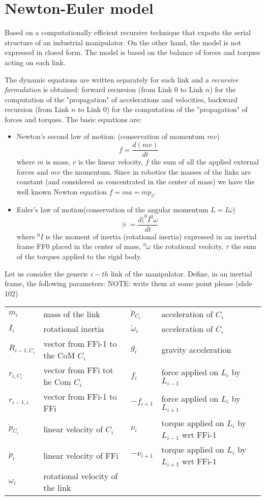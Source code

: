 \documentclass{book}
\begin{document}
\section{Newton-Euler model}
Based on a computationally efficient recursive technique that expoits the serial structure of an industrial manipulator. On the other hand, the model is not expressed in closed form.
The model is based on the balance of forces and torques acting on each link. 

The dynamic equations are written separately for each link and a \emph{recursive formulation} is obtained: forward recursion (from Link 0 to Link $n$) for the computation of the "propagation" of accelerations and velocities, backward recursion (from Link $n$ to Link 0) for the computation of the "propagation" of forces and torques. The basic equations are:
\begin{itemize}
    \item Newton's second law of motion: (conservation of momentum $mv$)
        \[
            f= \frac{d(mv)}{dt}
        \]
        where $m$ is mass, $v$ is the linear velocity, $f$ the sum of all the applied external forces and $mv$ the momentum. Since in robotics the masses of the links are constant (and considered as concentrated in the center of mass) we have the well known Newton equation $f=ma=m\ddot{p}_C$
    \item Euler's law of motion(conservation of the angular momentum $L=I\omega$)
        \[
            \ni = \frac{d(^0I^0\omega}{dt}
        \]
        where $^0I$ is the moment of inertia (rotational inertia) expressed in an inertial frame FF0 placed in the center of mass, $^0\omega$ the rotational veolcity, $\tau$ the sum of the torques applied to the rigid body.
\end{itemize}
Let us consider the generic $i-th$ link of the manipulator. Define, in an inertial frame, the following parameters: NOTE: write them at some point please (slide 102)
\begin{tabular}{ l l | l l }
    $m_i$ & mass of the link & $\ddot{p}_{C_i}$ & acceleration of $C_i$\\
    $I_i$ & rotational inertia & $\ddot{\omega}_i$ & acceleration of $C_i$\\
    $R_{i-1,C_i}$ & vector from FFi-1 to the CoM $C_i$ & $g_i$ & gravity acceleration \\
    $r_{i,C_i}$ & vector from FFi tot he Com $C_i$ & $f_i$ & force applied on $L_i$ by $L_{i-1} $\\
    $r_{i-1,i}$ & vector from FFi-1 to FFi & $-f_{i+1}$ & force applied on $L_i$ by $L_{i+1}$ \\
    $\dot{p}_{C_i}$ & linear velocity of $C_i$ & $\nu_i$ & torque applied on $L_i$ by $L_{i-1}$ wrt FFi-1 \\
    $\dot{p}_i$ & linear velocity of FFi & $-\nu_{i+1}$ &torque applied on $L_i$ by $L_{i+1}$ wrt FFi-1\\
    $\omega_i$ & rotational velocity of the link &  & 
\end{tabular}
\end{document}
